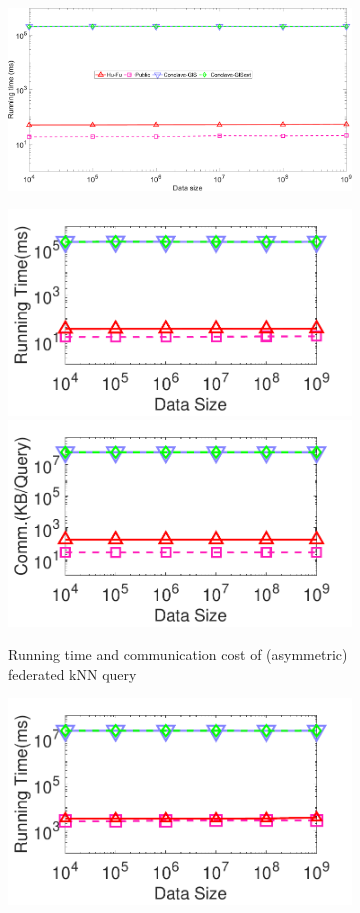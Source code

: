 \begin{figure}[t]
    \begin{subfigure}{0.45\textwidth}
        \centering
        \includegraphics[width=\textwidth]{apdx/legend_scalability.pdf}
    \end{subfigure}
    \begin{subfigure}{0.48\textwidth}
        \centering
        \includegraphics[width=0.48\linewidth]{apdx/knn_datasize_time_revision.pdf}
        \includegraphics[width=0.48\linewidth]{apdx/knn_datasize_cost_revision.pdf}
        \caption{Running time and communication cost of (asymmetric) federated kNN query}
        \label{fig:knn-eff-size-n-cty}
    \end{subfigure}  
    \begin{subfigure}{0.48\textwidth}
        \centering
        \includegraphics[width=0.48\linewidth]{apdx/knnjoin_datasize_time_revision.pdf}

\end{subfigure}
\end{figure}
